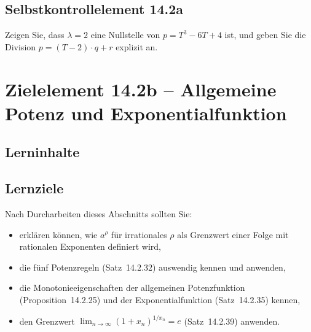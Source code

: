 \documentclass[a4paper,12pt]{article}
\begin{document}
\subsection*{Selbstkontrollelement 14.2a}

Zeigen Sie, dass $\lambda = 2$ eine Nullstelle von $p = T^3 - 6T + 4$ ist, und
geben Sie die Division $p = (T - 2) \cdot q + r$ explizit an.

\newpage

\section*{Zielelement 14.2b -- Allgemeine Potenz und Exponentialfunktion}

\subsection*{Lerninhalte}

\begin{center}
\end{center}

\subsection*{Lernziele}

Nach Durcharbeiten dieses Abschnitts sollten Sie:
\begin{itemize}
  \item erklären können, wie $a^\rho$ für irrationales $\rho$ als Grenzwert
        einer Folge mit rationalen Exponenten definiert wird,
  \item die fünf Potenzregeln (Satz~14.2.32) auswendig kennen und anwenden,
  \item die Monotonieeigenschaften der allgemeinen Potenzfunktion (Proposition~14.2.25)
        und der Exponentialfunktion (Satz~14.2.35) kennen,
  \item den Grenzwert $\lim_{n\to\infty}(1+x_n)^{1/x_n} = e$ (Satz~14.2.39) anwenden.
\end{itemize}
\end{document}
